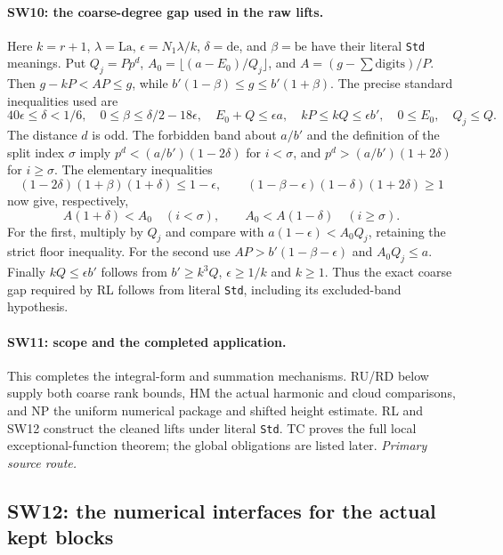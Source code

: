 \documentclass[11pt,a4paper]{article}
\numberwithin{equation}{section}
\theoremstyle{remark}\newtheorem{remark}[theorem]{Remark}
\begin{document}
\paragraph{SW10: the coarse-degree gap used in the raw lifts.}
Here $k=r+1$, $\lambda=\mathrm{La}$, $\epsilon=N_1\lambda/k$,
$\delta=\mathrm{de}$, and $\beta=\mathrm{be}$ have their literal
\texttt{Std} meanings. Put $Q_j=Pp^d$, $A_0=\lfloor(a-E_0)/Q_j\rfloor$,
and $A=(g-\sum\text{digits})/P$. Then
$g-kP<AP\le g$, while
$b'(1-\beta)\le g\le b'(1+\beta)$.
The precise standard inequalities used are
\[
 40\epsilon\le\delta<1/6,\quad
 0\le\beta\le\delta/2-18\epsilon,\quad
 E_0+Q\le\epsilon a,\quad
 kP\le kQ\le\epsilon b',\quad 0\le E_0,\quad Q_j\le Q.
 \tag{SW10.1}
\]
The distance $d$ is odd. The forbidden band about $a/b'$ and the
definition of the split index $\sigma$ imply
$p^d<(a/b')(1-2\delta)$ for $i<\sigma$, and
$p^d>(a/b')(1+2\delta)$ for $i\ge\sigma$.
The elementary inequalities
\[
 (1-2\delta)(1+\beta)(1+\delta)\le1-\epsilon,\qquad
 (1-\beta-\epsilon)(1-\delta)(1+2\delta)\ge1
\]
now give, respectively,
\[
 A(1+\delta)<A_0\quad(i<\sigma),\qquad
 A_0<A(1-\delta)\quad(i\ge\sigma).
 \tag{SW10.2}
\]
For the first, multiply by $Q_j$ and compare with
$a(1-\epsilon)<A_0Q_j$, retaining the strict floor inequality.
For the second use $AP>b'(1-\beta-\epsilon)$ and $A_0Q_j\le a$.
Finally $kQ\le\epsilon b'$ follows from $b'\ge k^3Q$,
$\epsilon\ge1/k$ and $k\ge1$.
Thus the exact coarse gap required by RL follows from literal
\texttt{Std}, including its excluded-band hypothesis.

\paragraph{SW11: scope and the completed application.}
This completes the integral-form and summation mechanisms.
RU/RD below supply both coarse rank bounds, HM the actual harmonic
and cloud comparisons, and NP the uniform numerical package and
shifted height estimate. RL and SW12 construct the cleaned lifts
under literal \texttt{Std}. TC proves the full local exceptional-function
theorem; the global obligations are listed later.
\noindent\textit{Primary source route.}\cite{segment-weighted-actual}


\subsection{SW12: the numerical interfaces for the actual kept blocks}
\label{sec:segment-numerics}
\end{document}
